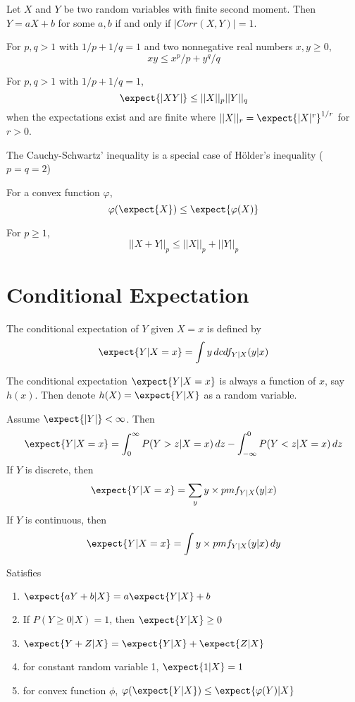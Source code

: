 \documentclass[11pt]{article}
\begin{document}
\theorem
Let $X$ and $Y$ be two random variables with finite second moment. Then $Y = aX + b$ for some $a,b$ if and only if $|Corr(X,Y)| = 1$.

For $p,q > 1$ with $1/p + 1/q = 1$ and two nonnegative real numbers $x,y \geq 0$,
$$xy \leq x^p/p + y^q /q$$

For $p,q > 1$ with $1/p + 1/q = 1$, $$\expect{|XY|} \leq ||X||_p ||Y||_q$$ when the expectations exist and are finite where
$||X||_r = \expect{|X|^r}^{1/r}$ for $r > 0$.

\remark The Cauchy-Schwartz' inequality is a special case of H\"older's inequality ($p=q=2$)

For a convex function $\varphi$, 
$$\varphi(\expect{X}) \leq \expect{\varphi(X)}$$

For $p \geq 1$, 
$$||X + Y||_p \leq ||X||_p + ||Y||_p$$

\section{Conditional Expectation}
The conditional expectation of $Y$ given $X = x$ is defined by
$$\expect{Y | X=x} = \int y \, dcdf_{Y|X}(y|x)$$

\remark The conditional expectation $\expect{Y|X=x}$ is always a function of $x$, say $h(x)$. Then denote $h(X) = \expect{Y|X}$ as a random variable.

\theorem
Assume $\expect{|Y|} < \infty$. Then
$$\expect{Y|X=x} = \int_0^\infty P(Y > z|X=x) \, dz - \int_{-\infty}^0 P(Y<z|X=x)\, dz$$
If $Y$ is discrete, then
$$\expect{Y|X=x} = \sum_y y \times pmf_{Y|X}(y|x)$$
If $Y$ is continuous, then
$$\expect{Y|X=x} = \int y \times pmf_{Y|X}(y|x) \, dy$$

Satisfies
\begin{enumerate}
	\item $\expect{aY + b| X} = a\expect{Y|X} + b$
	\item If $P(Y \geq 0|X) = 1$, then $\expect{Y|X} \geq 0$
	\item $\expect{Y + Z |X} = \expect{Y|X} + \expect{Z|X}$
	\item for constant random variable 1, $\expect{1|X} = 1$
	\item for convex function $\phi$, $\varphi(\expect{Y|X}) \leq \expect{\varphi(Y)|X}$
\end{enumerate}
\end{document}
